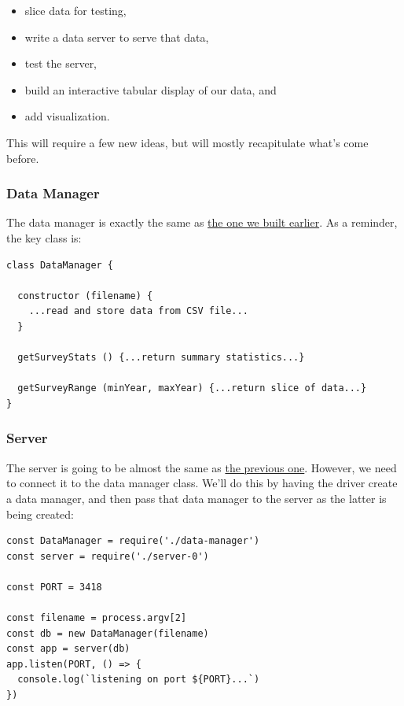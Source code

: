 \begin{itemize}
\tightlist
\item
  slice data for testing,
\item
  write a data server to serve that data,
\item
  test the server,
\item
  build an interactive tabular display of our data, and
\item
  add visualization.
\end{itemize}

This will require a few new ideas, but will mostly recapitulate what's
come before.

\subsubsection{Data Manager}\label{s:capstone-data}

The data manager is exactly the same as
\protect\hyperlink{s:dataman}{the one we built earlier}. As a reminder,
the key class is:

\begin{verbatim}
class DataManager {

  constructor (filename) {
    ...read and store data from CSV file...
  }

  getSurveyStats () {...return summary statistics...}

  getSurveyRange (minYear, maxYear) {...return slice of data...}
}
\end{verbatim}

\subsubsection{Server}\label{s:capstone-server}

The server is going to be almost the same as
\protect\hyperlink{s:server}{the previous one}. However, we need to
connect it to the data manager class. We'll do this by having the driver
create a data manager, and then pass that data manager to the server as
the latter is being created:

\begin{verbatim}
const DataManager = require('./data-manager')
const server = require('./server-0')

const PORT = 3418

const filename = process.argv[2]
const db = new DataManager(filename)
const app = server(db)
app.listen(PORT, () => {
  console.log(`listening on port ${PORT}...`)
})
\end{verbatim}

